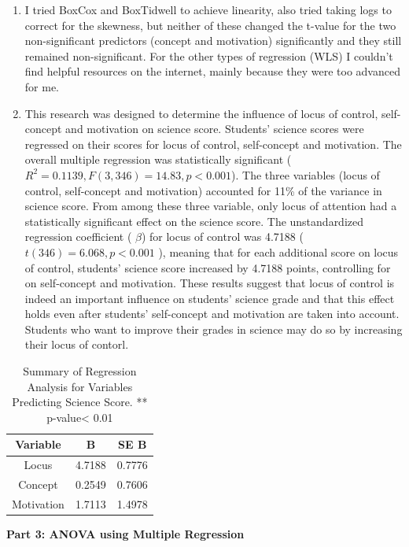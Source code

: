 \documentclass[]{article}
\begin{document}
\begin{enumerate}
\def\labelenumi{\arabic{enumi}.}
\item
  I tried BoxCox and BoxTidwell to achieve linearity, also tried taking
  logs to correct for the skewness, but neither of these changed the
  t-value for the two non-significant predictors (concept and
  motivation) significantly and they still remained non-significant. For
  the other types of regression (WLS) I couldn't find helpful resources
  on the internet, mainly because they were too advanced for me.
\item
  This research was designed to determine the influence of locus of
  control, self-concept and motivation on science score. Students'
  science scores were regressed on their scores for locus of control,
  self-concept and motivation. The overall multiple regression was
  statistically significant
  (\(R^2 = 0.1139, F(3, 346) = 14.83, p < 0.001\)). The three variables
  (locus of control, self-concept and motivation) accounted for 11\% of
  the variance in science score. From among these three variable, only
  locus of attention had a statistically significant effect on the
  science score. The unstandardized regression coefficient ( \(\beta\))
  for locus of control was 4.7188 ( \(t(346)= 6.068, p < 0.001\) ),
  meaning that for each additional score on locus of control, students'
  science score increased by 4.7188 points, controlling for on
  self-concept and motivation. These results suggest that locus of
  control is indeed an important influence on students' science grade
  and that this effect holds even after students' self-concept and
  motivation are taken into account. Students who want to improve their
  grades in science may do so by increasing their locus of contorl.
\end{enumerate}

\begin{table}[H]
\centering
\begin{tabular}{c|c|c}
Variable & B & SE B \\\hline
Locus & 4.7188\text{**} & 0.7776\\
Concept & 0.2549 & 0.7606\\
Motivation & 1.7113 & 1.4978
\end{tabular}
\caption{\label{tab:widgets}Summary of Regression Analysis for Variables Predicting Science Score. ** p-value< 0.01}
\end{table}

\begin{center}
\Large \textbf{Part 3: ANOVA using Multiple Regression}
\end{center}
\end{document}
